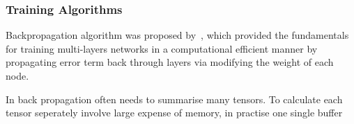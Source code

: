 \subsubsection{Training Algorithms}
Backpropagation algorithm was proposed by~\citet{werbos1975beyond}, which provided the fundamentals for training multi-layers networks in a computational efficient manner by propagating error term back through layers via modifying the weight of each node. 
\par
In back propagation often needs to summarise many tensors. To calculate each tensor seperately involve large expense of memory, in practise one single buffer